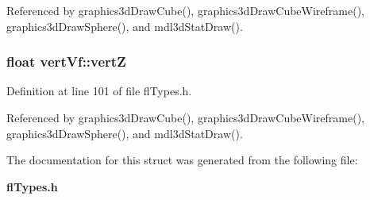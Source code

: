 Referenced by graphics3d\-Draw\-Cube(), graphics3d\-Draw\-Cube\-Wireframe(), graphics3d\-Draw\-Sphere(), and mdl3d\-Stat\-Draw().
\subsubsection{\setlength{\rightskip}{0pt plus 5cm}float {\bf vert\-Vf::vert\-Z}}\label{structvertVf_4525773e609e22811cf1cd204f41070c}




Definition at line 101 of file fl\-Types.h.

Referenced by graphics3d\-Draw\-Cube(), graphics3d\-Draw\-Cube\-Wireframe(), graphics3d\-Draw\-Sphere(), and mdl3d\-Stat\-Draw().

The documentation for this struct was generated from the following file:\begin{CompactItemize}
\item 
{\bf fl\-Types.h}\end{CompactItemize}
